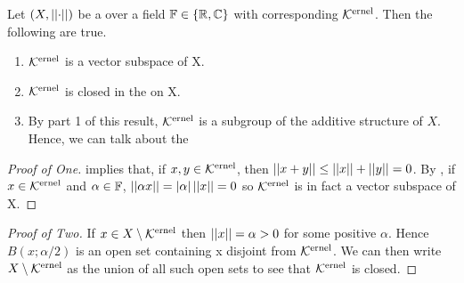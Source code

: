 \begin{prop}
\label{prop:seminormkernelisavectorsubspace}
    Let $(X,\left|\left| \cdot \right|\right|)$ be a \SeminormedSpace over a field $\mathbb{F} \in \{\mathbb{R}, \mathbb{C}\}$  
    with corresponding \SeminormKernel $\bf\mathcal{K}\rm^{ernel}$. 
    Then the following are true. 
    \begin{enumerate}
        \item $\bf\mathcal{K}\rm^{ernel}$ is a vector subspace of X. 
        \item $\bf\mathcal{K}\rm^{ernel}$ is closed in the \SeminormTopology on X.
        \item By part 1 of this result, $\bf\mathcal{K}\rm^{ernel}$ is a subgroup of the additive structure of $X$. Hence, we can talk about the 
    \end{enumerate}


    \begin{proof}[Proof of One]
        \Subadditivity implies that, if $x,y \in \bf\mathcal{K}\rm^{ernel}$, then $\left|\left| x+y \right|\right| \leq \left|\left| x \right|\right|+\left|\left| y \right|\right|=0$. 
        By \ScalarHomogeneity, if $x \in \bf\mathcal{K}\rm^{ernel}$  and $\alpha \in \mathbb{F}$, $\left|\left| \alpha x \right|\right| =|\alpha| \left|\left| x \right|\right|=0$
        so $\bf\mathcal{K}\rm^{ernel}$ is in fact a vector subspace of X. 
    \end{proof}
    \begin{proof}[Proof of Two]
        
        If $x \in X \setminus  \bf\mathcal{K}\rm^{ernel}$
        then $\left|\left| x \right|\right| = \alpha > 0$ for some positive $\alpha$. 
        Hence $B(x;\alpha/2)$ is an open set containing x disjoint from $\bf\mathcal{K}\rm^{ernel}$. 
       We can then write $X \setminus \bf\mathcal{K}\rm^{ernel}$ as the union of all such open sets to see that $\bf\mathcal{K}\rm^{ernel}$ is closed. 
    \end{proof}
\end{prop}
